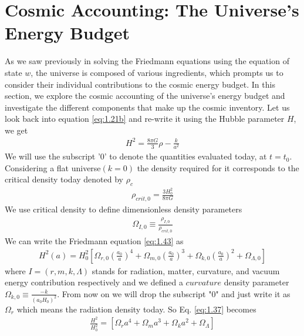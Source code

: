
\section{Cosmic Accounting: The Universe's Energy Budget} \label{section 1.4}
\hspace{0.5cm}As we saw previously in solving the Friedmann equations using the equation of state $w$, the universe is composed of various ingredients, which prompts us to consider their individual contributions to the cosmic energy budget. 
In this section, we explore the cosmic accounting of the universe's energy budget and investigate the different components that make up the cosmic inventory.
Let us look back into equation  \ref{eq:1.21b} and re-write it using the Hubble parameter $H$, we get
\begin{align}
    H^2 = \frac{8 \pi G}{3} \rho - \frac{k}{a^2} \label{eq:1.43}
\end{align}
We will use the subscript '0' to denote the quantities evaluated today, at $t= t_0$. Considering a flat universe$(k = 0)$ the density required for it corresponds to the critical density today denoted by $\rho_c$
\begin{align}
    \rho_{crit,0} =\frac{3H_{0}^{2}}{8\pi G} \label{eq:1.35}
\end{align}
We use critical density to define dimensionless density parameters
\begin{align}
    \Omega_{I,0} \equiv \frac{\rho_{I,0}}{\rho_{crit,0}}\label{eq:1.36}
\end{align}
We can write the Friedmann equation \ref{eq:1.43} as
\begin{align}
    H^2(a) = H_{0}^2 \left[\Omega_{r,0}\left(\frac{a_0}{a}\right)^4 + \Omega_{m,0}\left(\frac{a_0}{a}\right)^3 + \Omega_{k,0}\left(\frac{a_0}{a}\right)^2 +\Omega_{\Lambda,0}\right] \label{eq:1.37}
\end{align}
where $I = (r,m,k,\Lambda)$ stands for radiation, matter, curvature, and vacuum energy contribution respectively and we defined a $curvature$ density parameter $ \Omega_{k,0} \equiv \frac{-k}{(a_0H_0)^2}$. From now on we will drop the subscript "0" and just write it as  $\Omega_{r}$ which means the radiation density today. So Eq. \ref{eq:1.37} becomes
\begin{align}
     \frac{H^2}{H_{0}^2} = [\Omega_{r}a^4 + \Omega_{m}a^3 + \Omega_{k}a^2 +\Omega_{\Lambda}] \label{eq:1.38}
\end{align}
